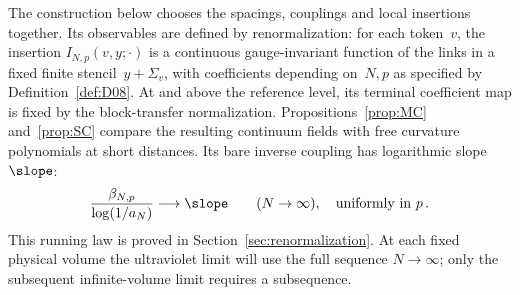 The construction below chooses the spacings, couplings and local insertions together. Its observables are defined by renormalization: for each token~$v$, the insertion $I_{N,p}(v,y;\cdot)$ is a continuous gauge-invariant function of the links in a fixed finite stencil~$y+\Sigma_v$, with coefficients depending on~$N,p$ as specified by Definition~\ref{def:D08}. At and above the reference level, its terminal coefficient map is fixed by the block-transfer normalization. Propositions~\ref{prop:MC} and~\ref{prop:SC} compare the resulting continuum fields with free curvature polynomials at short distances. Its bare inverse coupling has logarithmic slope~$\slope$:
\begin{equation}\label{eq:I12-bare-slope}
\frac{\beta_{N,p}}{\log(1/a_N)}\longrightarrow\slope
\qquad(N\to\infty),\quad\text{uniformly in }p\,.
\end{equation}
This running law is proved in Section~\ref{sec:renormalization}. At each fixed physical volume the ultraviolet limit will use the full sequence $N\to\infty$; only the subsequent infinite-volume limit requires a subsequence.
